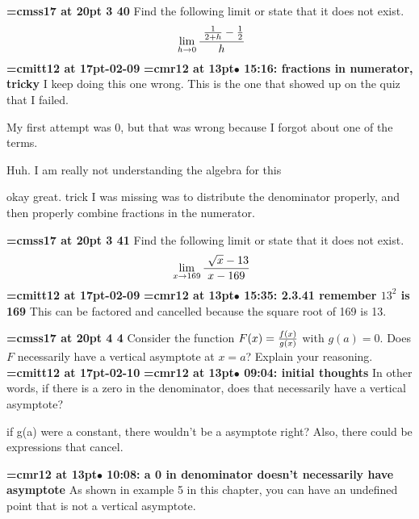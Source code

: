 {\medskip\noindent\bf\font\titlefont=cmss17 at 20pt 3 40}\medskip
Find the following limit or state that it does
not exist.
$$\
\lim_{h \to 0} {\
{{1 \over 2 + h} - {1 \over 2}} \over h
}
$$
{\medskip\noindent\bf\font\titlefont=cmitt12 at 17pt-02-09}\medskip
{\smallskip\noindent\bf\font\titlefont=cmr12 at 13pt\titlefont $\bullet$ 15:16: fractions in numerator, tricky}\smallskip
I keep doing this one wrong. This is the one that showed up on the quiz that I failed.
\par

My first attempt was 0, but that was wrong because I forgot about one of the terms.
\par

Huh. I am really not understanding the algebra for this
\par

okay great. trick I was missing was to distribute the denominator properly, and then properly combine fractions in the numerator.
\par

{\medskip\noindent\bf\font\titlefont=cmss17 at 20pt 3 41}\medskip
Find the following limit or state that it does not exist.
$$\
\lim_{x \to 169} {\
{\sqrt{x} - 13}
\over
{x - 169}
}
$$
{\medskip\noindent\bf\font\titlefont=cmitt12 at 17pt-02-09}\medskip
{\smallskip\noindent\bf\font\titlefont=cmr12 at 13pt\titlefont $\bullet$ 15:35: 2.3.41 remember $13^2$ is 169}\smallskip
This can be factored and cancelled because the square root of 169 is 13.
\par

\xrdef{node15}
{\medskip\noindent\bf\font\titlefont=cmss17 at 20pt\titlefont 2 4 4}\medskip
Consider the function $F(x) = {f(x) \over g(x)}$ with $g(a) = 0$.
Does $F$ necessarily have a vertical asymptote at $x = a$?
Explain your reasoning.
{\medskip\noindent\bf\font\titlefont=cmitt12 at 17pt\titlefont 2026-02-10}\medskip
{\smallskip\noindent\bf\font\titlefont=cmr12 at 13pt\titlefont $\bullet$ 09:04: initial thoughts}\smallskip
In other words, if there is a zero in the denominator, does that necessarily have a vertical asymptote?
\par

if g(a) were a constant, there wouldn't be a asymptote right? Also, there could be expressions that cancel.
\par

{\smallskip\noindent\bf\font\titlefont=cmr12 at 13pt\titlefont $\bullet$ 10:08: a 0 in denominator doesn't necessarily have asymptote}\smallskip
As shown in example 5 in this chapter, you can have an undefined point that is not a vertical asymptote.
\par

